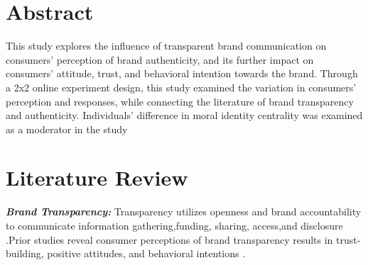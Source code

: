 \documentclass[a0,portrait]{a0poster}
\begin{document}
\begin{minipage}[c]{\linewidth}
\begin{framed}
\begin{multicols}{2}
\section*{Abstract}
\color{Black}
This study explores the influence of transparent brand communication on consumers' perception of brand authenticity, and its further impact on consumers' attitude, trust, and behavioral intention towards the brand. Through a 2x2 online experiment design, this study examined the variation in consumers' perception and responses, while connecting the literature of brand transparency and authenticity. Individuals' difference in moral identity centrality was examined as a moderator in the study\\

\color{Maroon}
\section*{Literature Review}
\color{Black}

  \color{Maroon} \textbf{\emph{Brand Transparency:}} \color{Black}
Transparency utilizes openness \autocite{parris_exploring_2016}and brand accountability\autocite{yoo_brand_2014} to communicate information gathering,funding, sharing, access,and disclosure \autocite{phillips_online_2009}\autocite{wojdynski_measuring_2018} \autocite{yoo_brand_2014}\autocite{brandao_impact_2018}.Prior studies reveal consumer perceptions of brand transparency results in trust-building, positive attitudes, and behavioral intentions \autocite{reynolds_moral_2008}.\\


\end{multicols}
\end{framed}
\end{minipage}
\end{document}
